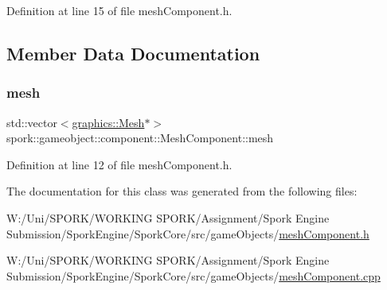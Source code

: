 Definition at line 15 of file mesh\+Component.\+h.



\subsection{Member Data Documentation}
\mbox{\label{classspork_1_1gameobject_1_1component_1_1_mesh_component_a7d59263e36ff884bc0e8dc50bab78871}} 
\subsubsection{\texorpdfstring{mesh}{mesh}}
{\footnotesize\ttfamily std\+::vector$<$\hyperlink{classspork_1_1graphics_1_1_mesh}{graphics\+::\+Mesh}$\ast$$>$ spork\+::gameobject\+::component\+::\+Mesh\+Component\+::mesh}



Definition at line 12 of file mesh\+Component.\+h.



The documentation for this class was generated from the following files\+:\begin{DoxyCompactItemize}
\item 
W\+:/\+Uni/\+S\+P\+O\+R\+K/\+W\+O\+R\+K\+I\+N\+G S\+P\+O\+R\+K/\+Assignment/\+Spork Engine Submission/\+Spork\+Engine/\+Spork\+Core/src/game\+Objects/\hyperlink{mesh_component_8h}{mesh\+Component.\+h}\item 
W\+:/\+Uni/\+S\+P\+O\+R\+K/\+W\+O\+R\+K\+I\+N\+G S\+P\+O\+R\+K/\+Assignment/\+Spork Engine Submission/\+Spork\+Engine/\+Spork\+Core/src/game\+Objects/\hyperlink{mesh_component_8cpp}{mesh\+Component.\+cpp}\end{DoxyCompactItemize}
